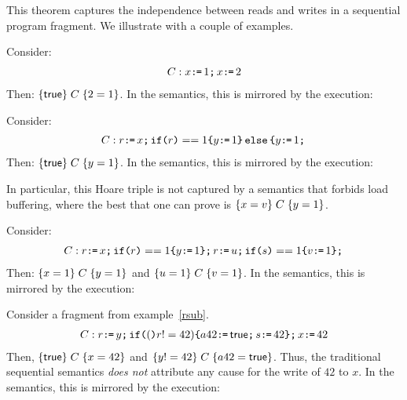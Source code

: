 This theorem captures the independence between reads and writes in a sequential program fragment.  We illustrate with a couple of examples.

\begin{example}
Consider:
\begin{align*}
C:   x\texttt{:}\mkern-1mu\texttt{=}\, 1 \texttt{;}\, x \texttt{:}\mkern-1mu\texttt{=}\, 2
\end{align*}
Then: $\{\mathsf{true}\}\;C\;\{2=1\} $.  In the semantics, this is mirrored by the execution:
\begin{tikzdisplay}[node distance=1em]
\end{tikzdisplay}
\end{example}

\begin{example}
Consider:
\begin{align*}
C:   r \texttt{:}\mkern-1mu\texttt{=}\, x \texttt{;}\, \texttt{if}\allowbreak\texttt{(}r\texttt{)}==1 \allowbreak\texttt{\{} y \texttt{:}\mkern-1mu\texttt{=}\, 1 \texttt{\}}\,\allowbreak\texttt{else}\allowbreak\,\texttt{\{} y \texttt{:}\mkern-1mu\texttt{=}\, 1 \texttt{;}\,
\end{align*}
Then: $\{\mathsf{true}\}\;C\;\{y=1\} $.  In the semantics, this is mirrored by the execution:
\begin{tikzdisplay}[node distance=1em]
\end{tikzdisplay}
In particular, this Hoare triple is not captured by a semantics that forbids load buffering, where the best that one can prove is
$\{x=v\}\;C\;\{y= 1\} $.
\end{example}

\begin{example}
Consider:
\begin{align*}
C:   r \texttt{:}\mkern-1mu\texttt{=}\, x \texttt{;}\, \texttt{if}\allowbreak\texttt{(}r\texttt{)}==1 \allowbreak\texttt{\{} y \texttt{:}\mkern-1mu\texttt{=}\, 1 \texttt{\}} \texttt{;}\, r \texttt{:}\mkern-1mu\texttt{=}\, u \texttt{;}\, \texttt{if}\allowbreak\texttt{(}s\texttt{)}==1 \allowbreak\texttt{\{} v \texttt{:}\mkern-1mu\texttt{=}\, 1 \texttt{\}} \texttt{;}\,
\end{align*}
Then: $\{x=1\}\;C\;\{y=1\} $ and $\{u=1\}\;C\;\{v=1\} $.  In the semantics, this is mirrored by the execution:
\begin{tikzdisplay}[node distance=1em]
\end{tikzdisplay}
\end{example}

\begin{example}
Consider a fragment from example~\ref{rsub}.
\begin{align*}
C: r \texttt{:}\mkern-1mu\texttt{=}\, y \texttt{;}\, \texttt{if}\allowbreak\texttt{(}(\texttt{)}r !=42) \allowbreak\texttt{\{} a42 \texttt{:}\mkern-1mu\texttt{=}\, \mathsf{true} \texttt{;}\, s \texttt{:}\mkern-1mu\texttt{=}\, 42 \texttt{\}} \texttt{;}\, x \texttt{:}\mkern-1mu\texttt{=}\, 42
\end{align*}
Then, $\{\mathsf{true}\}\;C\;\{x=42\} $ and $\{y !=42\}\;C\;\{a42= \mathsf{true}\} $.  Thus, the traditional sequential semantics {\em does not} attribute any cause for the write of $42$ to $x$.  
In the semantics, this is mirrored by the execution:
\begin{tikzdisplay}[node distance=1em]
\end{tikzdisplay}
\end{example}


\endinput 



